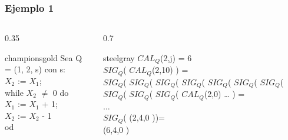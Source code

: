 \documentclass[xcolor=table]{beamer}
\begin{document}
\begin{frame}[fragile]\frametitle{Ejemplo 1} \footnotesize  

\begin{columns}

    \begin{column}{0.35\textwidth}
        \begin{colorblock}[black]{championsgold}{}\scriptsize
        Sea Q = (1, 2, s) con s: \\
        \hspace{0.5cm}   $X_2$ := $X_1$;\\
        \hspace{0.5cm}   while $X_2$ $\neq$ 0 do \\
        \hspace{0.75cm}    $X_1$ := $X_1$ + 1;\\
        \hspace{0.75cm}    $X_2$ := $X_2$ - 1\\
        \hspace{0.5cm}  od
        \end{colorblock}
 \end{column}

  \begin{column}{0.7\textwidth}
        \begin{colorblock}[white]{steelgray}{}\scriptsize
           $CAL_Q$(2,j) = 6 \\
           $SIG_Q$( $CAL_Q$(2,10) ) =\\
           $SIG_Q$( $SIG_Q$( $SIG_Q$( $SIG_Q$( $SIG_Q$( $SIG_Q$( $SIG_Q$( $SIG_Q$( $SIG_Q$( $SIG_Q$( $CAL_Q$(2,0) … ) =\\
          $\ldots$\\
           $SIG_Q$( (2,4,0 ))=\\
          (6,4,0 )

            \end{colorblock}
    \end{column}
\end{columns}
\begin{columns}


\end{columns}
\end{frame}
\end{document}
